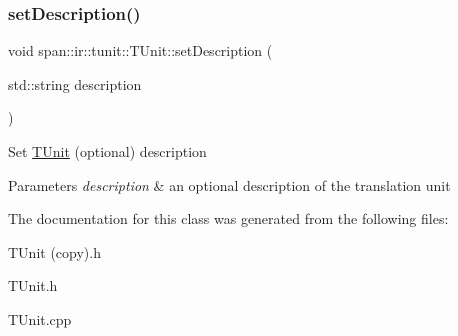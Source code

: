 \subsubsection{\texorpdfstring{set\+Description()}{setDescription()}\hspace{0.1cm}{\footnotesize\ttfamily [2/2]}}
{\footnotesize\ttfamily void span\+::ir\+::tunit\+::\+T\+Unit\+::set\+Description (\begin{DoxyParamCaption}\item[{std\+::string}]{description }\end{DoxyParamCaption})}

Set \hyperlink{classspan_1_1ir_1_1tunit_1_1TUnit}{T\+Unit} (optional) description 
\begin{DoxyParams}{Parameters}
{\em description} & an optional description of the translation unit \\
\hline
\end{DoxyParams}


The documentation for this class was generated from the following files\+:\begin{DoxyCompactItemize}
\item 
T\+Unit (copy).\+h\item 
T\+Unit.\+h\item 
T\+Unit.\+cpp\end{DoxyCompactItemize}
